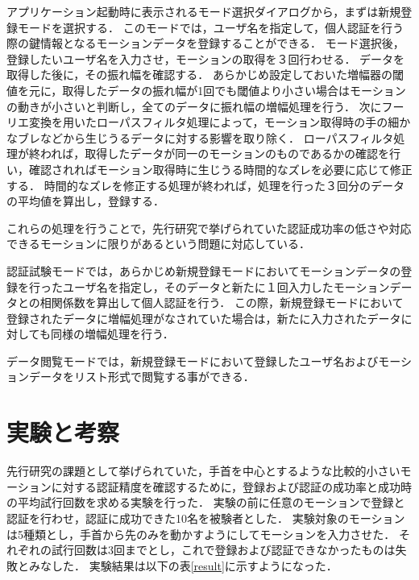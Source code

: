 \documentclass[11pt]{jarticle}
\begin{document}
アプリケーション起動時に表示されるモード選択ダイアログから，まずは新規登録モードを選択する．
このモードでは，ユーザ名を指定して，個人認証を行う際の鍵情報となるモーションデータを登録することができる．
モード選択後，登録したいユーザ名を入力させ，モーションの取得を３回行わせる．
データを取得した後に，その振れ幅を確認する．
あらかじめ設定しておいた増幅器の閾値を元に，取得したデータの振れ幅が1回でも閾値より小さい場合はモーションの動きが小さいと判断し，全てのデータに振れ幅の増幅処理を行う．
次にフーリエ変換を用いたローパスフィルタ処理によって，モーション取得時の手の細かなブレなどから生じうるデータに対する影響を取り除く．
ローパスフィルタ処理が終われば，取得したデータが同一のモーションのものであるかの確認を行い，確認されればモーション取得時に生じうる時間的なズレを必要に応じて修正する．
時間的なズレを修正する処理が終われば，処理を行った３回分のデータの平均値を算出し，登録する．

これらの処理を行うことで，先行研究で挙げられていた認証成功率の低さや対応できるモーションに限りがあるという問題に対応している．

認証試験モードでは，あらかじめ新規登録モードにおいてモーションデータの登録を行ったユーザ名を指定し，そのデータと新たに１回入力したモーションデータとの相関係数を算出して個人認証を行う．
この際，新規登録モードにおいて登録されたデータに増幅処理がなされていた場合は，新たに入力されたデータに対しても同様の増幅処理を行う．

データ閲覧モードでは，新規登録モードにおいて登録したユーザ名およびモーションデータをリスト形式で閲覧する事ができる．

\section{実験と考察}
先行研究の課題として挙げられていた，手首を中心とするような比較的小さいモーションに対する認証精度を確認するために，登録および認証の成功率と成功時の平均試行回数を求める実験を行った．
実験の前に任意のモーションで登録と認証を行わせ，認証に成功できた10名を被験者とした．
実験対象のモーションは5種類とし，手首から先のみを動かすようにしてモーションを入力させた．
それぞれの試行回数は3回までとし，これで登録および認証できなかったものは失敗とみなした．
実験結果は以下の表\ref{result}に示すようになった．
\end{document}
